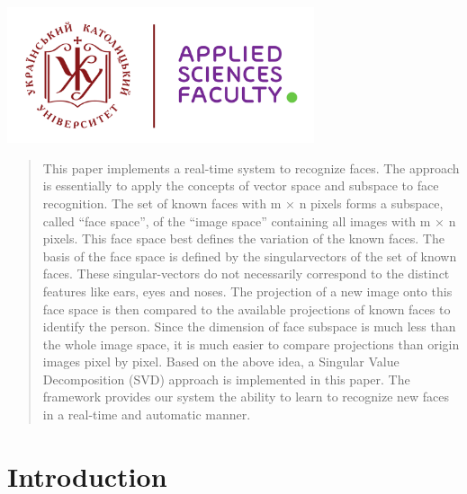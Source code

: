 \begin{titlepage}
\includegraphics[height=4cm]{UCU-Apps.png}\\[1cm] %
 

\vfill %

\end{titlepage}


\begin{abstract}
This paper implements a real-time system to
recognize faces. The approach is essentially
to apply the concepts of vector space and
subspace to face recognition. The set of
known faces with m × n pixels forms a
subspace, called “face space”, of the “image
space” containing all images with m × n
pixels. This face space best defines the
variation of the known faces. The basis of
the face space is defined by the singularvectors
of the set of known faces. These
singular-vectors do not necessarily correspond
to the distinct features like ears,
eyes and noses. The projection of a new
image onto this face space is then compared
to the available projections of known faces
to identify the person. Since the dimension
of face subspace is much less than the whole
image space, it is much easier to compare
projections than origin images pixel by pixel.
Based on the above idea, a Singular Value
Decomposition (SVD) approach is
implemented in this paper. The framework
provides our system the ability to learn to
recognize new faces in a real-time and
automatic manner.
\end{abstract}

\section{Introduction}

